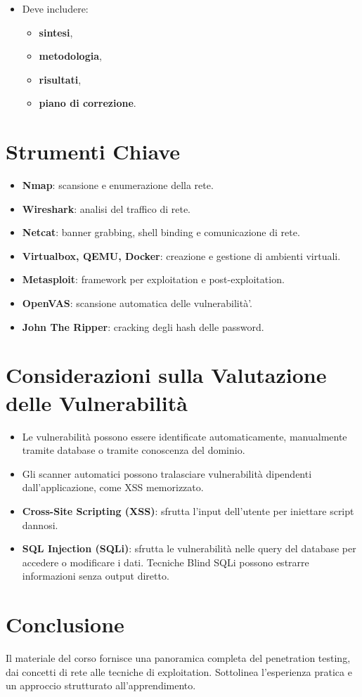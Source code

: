 \documentclass[12pt]{article}
\begin{document}
\begin{enumerate}
\begin{enumerate}
\begin{itemize}
            \item Deve includere:
            \begin{itemize}
                \item \textbf{sintesi},
                \item \textbf{metodologia},
                \item \textbf{risultati},
                \item \textbf{piano di correzione}.
            \end{itemize}
        \end{itemize}
    \end{enumerate}
    
\end{enumerate}




\section{Strumenti Chiave}
\begin{itemize}
    \item \textbf{Nmap}: scansione e enumerazione della rete.
    \item \textbf{Wireshark}: analisi del traffico di rete.
    \item \textbf{Netcat}: banner grabbing, shell binding e comunicazione di rete.
    \item \textbf{Virtualbox, QEMU, Docker}: creazione e gestione di ambienti virtuali.
    \item \textbf{Metasploit}: framework per exploitation e post-exploitation.
    \item \textbf{OpenVAS}: scansione automatica delle vulnerabilit\`{a}'.
    \item \textbf{John The Ripper}: cracking degli hash delle password. 
\end{itemize}


\section{Considerazioni sulla Valutazione delle Vulnerabilit\`{a}}
\begin{itemize}
    \item Le vulnerabilit\`{a} possono essere identificate automaticamente, 
    manualmente tramite database o tramite conoscenza del dominio.
    \item Gli scanner automatici possono tralasciare vulnerabilit\`{a} dipendenti 
    dall'applicazione, come XSS memorizzato.
    \item \textbf{Cross-Site Scripting (XSS)}: sfrutta l'input dell'utente per 
    iniettare script dannosi.
    \item \textbf{SQL Injection (SQLi)}: sfrutta le vulnerabilit\`{a} nelle query 
    del database per accedere o modificare i dati. Tecniche Blind SQLi possono 
    estrarre informazioni senza output diretto. 
\end{itemize}


\section{Conclusione}
Il materiale del corso fornisce una panoramica completa del penetration testing, 
dai concetti di rete alle tecniche di exploitation. Sottolinea l'esperienza 
pratica e un approccio strutturato all'apprendimento.
\end{document}
